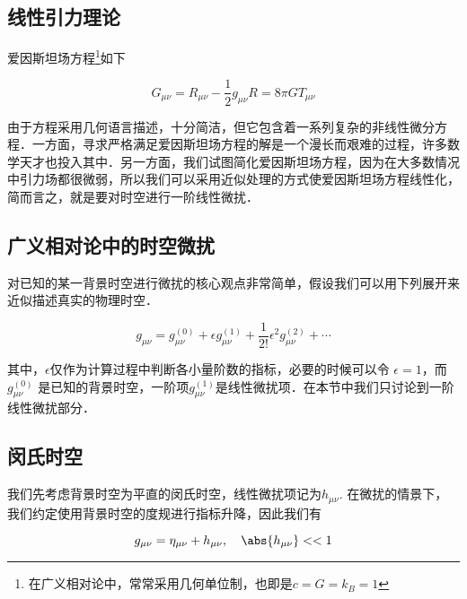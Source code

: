 
\begin{issues}
\issueMissDepend
\issueDraft
\end{issues}



\subsection{线性引力理论}
爱因斯坦场方程\footnote{在广义相对论中，常常采用几何单位制，也即是$c=G=k_B=1$}如下

\begin{equation}
G_{\mu \nu} = R_{\mu \nu} - \frac{1}{2}g_{\mu\nu}R = 8\pi G T_{\mu\nu}
\end{equation}

由于方程采用几何语言描述，十分简洁，但它包含着一系列复杂的非线性微分方程．一方面，寻求严格满足爱因斯坦场方程的解是一个漫长而艰难的过程，许多数学天才也投入其中．另一方面，我们试图简化爱因斯坦场方程，因为在大多数情况中引力场都很微弱，所以我们可以采用近似处理的方式使爱因斯坦场方程线性化，简而言之，就是要对时空进行一阶线性微扰．


\subsection{广义相对论中的时空微扰}

对已知的某一背景时空进行微扰的核心观点非常简单，假设我们可以用下列展开来近似描述真实的物理时空．

\begin{equation}
g_{\mu\nu}=g^{(0)}_{\mu\nu} + \epsilon g^{(1)}_{\mu\nu} + \frac{1}{2!}\epsilon^2 g^{(2)}_{\mu\nu}+\cdots
\end{equation}

其中，$\epsilon $仅作为计算过程中判断各小量阶数的指标，必要的时候可以令 $\epsilon = 1 $，而$g^{(0)}_{\mu\nu} $ 是已知的背景时空，一阶项$g^{(1)}_{\mu\nu}$是线性微扰项．在本节中我们只讨论到一阶线性微扰部分．


\subsection{闵氏时空}

我们先考虑背景时空为平直的闵氏时空，线性微扰项记为$h_{\mu\nu}$. 在微扰的情景下，我们约定使用背景时空的度规进行指标升降，因此我们有

\begin{equation}
g_{\mu\nu} = \eta_{\mu\nu} + h_{\mu\nu}, \quad \abs{h_{\mu\nu}}<<1 
\end{equation}

